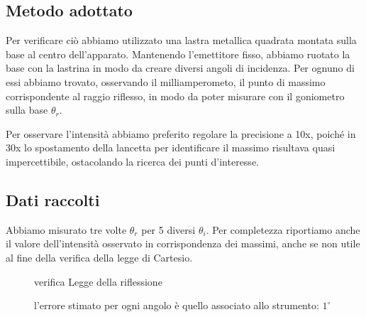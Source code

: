 \documentclass{article}
\theoremstyle{definition}
\begin{document}
\subsection{Metodo adottato}

Per verificare ciò abbiamo utilizzato una lastra metallica quadrata montata sulla base al centro dell'apparato. Mantenendo l'emettitore fisso, abbiamo ruotato la base con la lastrina in modo da creare diversi angoli di incidenza. Per ognuno di essi abbiamo trovato, osservando il milliamperometo, il punto di massimo corrispondente al raggio riflesso, in modo da poter misurare con il goniometro sulla base $\theta_r$.\\
\pagebreak

\begin{figure}[!ht]
    	\captionsetup{labelformat=empty}

\end{figure}

\noindent Per osservare l'intensità abbiamo preferito regolare la precisione a 10x, poiché in 30x lo spostamento della lancetta per identificare il massimo risultava quasi impercettibile, ostacolando la ricerca dei punti d'interesse.

\subsection{Dati raccolti}
Abbiamo misurato tre volte $\theta_r$ per 5 diversi $\theta_i$. Per completezza riportiamo anche il valore dell'intensità  osservato in corrispondenza dei massimi, anche se non utile al fine della verifica della legge di Cartesio.

\begin{figure}[!htbp]
    	\captionsetup{labelformat=empty}
        \caption{verifica Legge della riflessione}
    	\caption{l'errore stimato per ogni angolo è quello associato allo strumento: \(1^{\circ}\)}
\end{figure}
\end{document}
